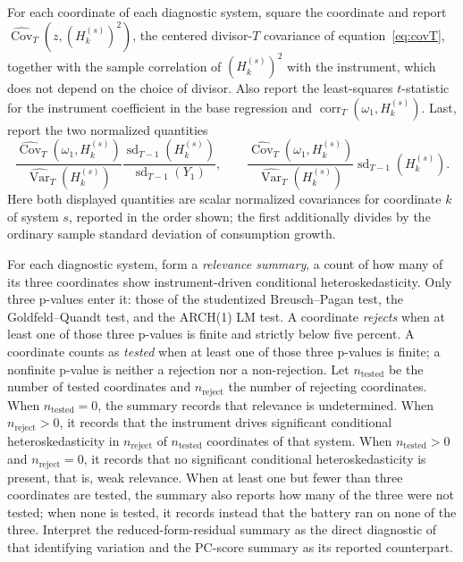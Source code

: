 \documentclass[11pt]{article}
\begin{document}
For each coordinate of each diagnostic system, square the coordinate and report
\(\widehat{\operatorname{Cov}}_T(z,(H_k^{(s)})^2)\), the centered divisor-\(T\) covariance of
equation~\eqref{eq:covT}, together with the sample correlation of \((H_k^{(s)})^2\) with the instrument,
which does not depend on the choice of divisor. Also report the least-squares \(t\)-statistic for the instrument coefficient in the base
regression and \(\operatorname{corr}_T(\omega_1,H_k^{(s)})\). Last, report the two normalized quantities
\[
 \frac{\widehat{\operatorname{Cov}}_T(\omega_1,H_k^{(s)})}
 {\widehat{\operatorname{Var}}_T(H_k^{(s)})}
 \frac{\operatorname{sd}_{T-1}(H_k^{(s)})}{\operatorname{sd}_{T-1}(Y_1)},
 \qquad
 \frac{\widehat{\operatorname{Cov}}_T(\omega_1,H_k^{(s)})}
 {\widehat{\operatorname{Var}}_T(H_k^{(s)})}\operatorname{sd}_{T-1}(H_k^{(s)}).
\]
Here both displayed quantities are scalar normalized covariances for coordinate \(k\) of system \(s\), reported
in the order shown; the first additionally divides by the ordinary sample standard deviation of
consumption growth.

For each diagnostic system, form a \emph{relevance summary}, a count of how many of its three
coordinates show instrument-driven conditional heteroskedasticity. Only
three p-values enter it: those of the studentized Breusch--Pagan test, the
Goldfeld--Quandt test, and the ARCH(1) LM test. A coordinate \emph{rejects} when at least one of those
three p-values is finite and strictly below five percent. A coordinate counts as \emph{tested} when at
least one of those three p-values is finite; a nonfinite p-value is neither a rejection nor a
non-rejection. Let \(n_{\mathrm{tested}}\) be the number of tested coordinates and \(n_{\mathrm{reject}}\)
the number of rejecting coordinates. When \(n_{\mathrm{tested}}=0\), the summary records that relevance is
undetermined. When \(n_{\mathrm{reject}}>0\), it records that the instrument drives significant
conditional heteroskedasticity in \(n_{\mathrm{reject}}\) of \(n_{\mathrm{tested}}\) coordinates
of that system. When
\(n_{\mathrm{tested}}>0\) and \(n_{\mathrm{reject}}=0\), it records that no significant conditional
heteroskedasticity is present, that is, weak relevance. When at least one but fewer than three coordinates are
tested, the summary also reports how many of the three were not tested; when none is tested, it records
instead that the battery ran on none of the three. Interpret the reduced-form-residual summary as the direct diagnostic of that identifying variation and the PC-score summary as its reported counterpart.
\end{document}
